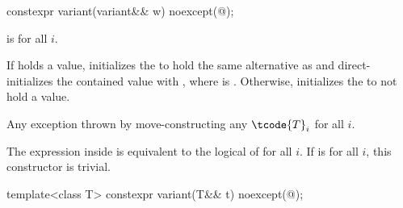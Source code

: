 %
\begin{itemdecl}
constexpr variant(variant&& w) noexcept(@\seebelow@);
\end{itemdecl}

\begin{itemdescr}
\pnum
\constraints
{} is  for all $i$.

\pnum
\effects
If  holds a value, initializes the  to hold the same
alternative as  and direct-initializes the contained value with
, where  is .
Otherwise, initializes the  to not hold a value.

\pnum
\throws
Any exception thrown by move-constructing any $\tcode{T}_i$ for all $i$.

\pnum
\remarks
The expression inside  is equivalent to the logical  of
 for all $i$.
If 
is  for all $i$, this constructor is trivial.
\end{itemdescr}

%
\begin{itemdecl}
template<class T> constexpr variant(T&& t) noexcept(@\seebelow@);
\end{itemdecl}

